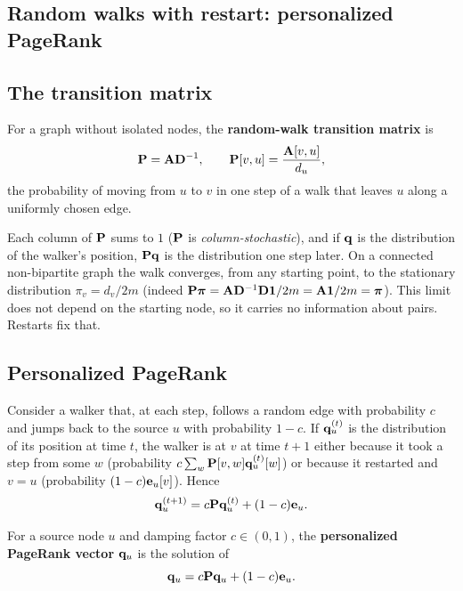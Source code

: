 \begin{notechapter}
\section{Random walks with restart: personalized PageRank}

\subsection{The transition matrix}

\begin{definition}\label{node-similarity:def:transition}
For a graph without isolated nodes, the \textbf{random-walk transition matrix} is
\begin{equation}
\mathbf{P} = \mathbf{A}\mathbf{D}^{-1}, \qquad \mathbf{P}[v,u] = \frac{\mathbf{A}[v,u]}{d_u},
\label{node-similarity:eq:transition}
\end{equation}
the probability of moving from $u$ to $v$ in one step of a walk that leaves $u$ along a uniformly chosen edge.
\end{definition}

Each column of $\mathbf{P}$ sums to $1$ ($\mathbf{P}$ is \emph{column-stochastic}), and if $\mathbf{q}$ is the distribution of the walker's position, $\mathbf{P}\mathbf{q}$ is the distribution one step later. On a connected non-bipartite graph the walk converges, from any starting point, to the stationary distribution $\pi_v = d_v/2m$ (indeed $\mathbf{P}\boldsymbol\pi = \mathbf{A}\mathbf{D}^{-1}\mathbf{D}\mathbf1/2m = \mathbf{A}\mathbf1/2m = \boldsymbol\pi$). This limit does not depend on the starting node, so it carries no information about pairs. Restarts fix that.

\subsection{Personalized PageRank}

Consider a walker that, at each step, follows a random edge with probability $c$ and jumps back to the source $u$ with probability $1 - c$. If $\mathbf{q}_u^{(t)}$ is the distribution of its position at time $t$, the walker is at $v$ at time $t + 1$ either because it took a step from some $w$ (probability $c\sum_w\mathbf{P}[v,w]\mathbf{q}_u^{(t)}[w]$) or because it restarted and $v = u$ (probability $(1-c)\mathbf{e}_u[v]$). Hence
\begin{equation}
\mathbf{q}_u^{(t+1)} = c\mathbf{P}\mathbf{q}_u^{(t)} + (1-c)\mathbf{e}_u .
\label{node-similarity:eq:ppr-dynamics}
\end{equation}

\begin{definition}\label{node-similarity:def:ppr}
For a source node $u$ and damping factor $c\in(0,1)$, the \textbf{personalized PageRank vector} $\mathbf{q}_u$ is the solution of
\begin{equation}
\mathbf{q}_u = c\mathbf{P}\mathbf{q}_u + (1-c)\mathbf{e}_u .
\label{node-similarity:eq:ppr-recurrence}
\end{equation}
\end{definition}


\end{notechapter}
